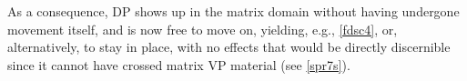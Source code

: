 \documentclass[output=paper]{langsci/langscibook}
\begin{document}

\largerpage
As a consequence, DP shows up in the matrix domain without having undergone
movement itself, and is now free to move on, yielding, e.g., \eqref{fdsc4}, or,
alternatively, to stay in place, with no effects that would be directly
discernible since it cannot have crossed matrix VP material (see \cref{spr7s}).
\end{document}
